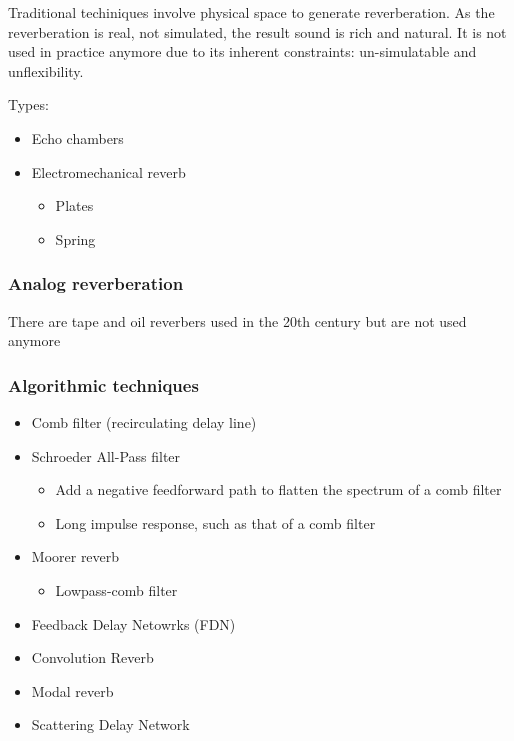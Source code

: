 \documentclass[11pt]{article}
\providecommand{\tightlist}{%
      \setlength{\itemsep}{0pt}\setlength{\parskip}{0pt}}
\begin{document}
Traditional techiniques involve physical space to generate
reverberation. As the reverberation is real, not simulated, the result
sound is rich and natural. It is not used in practice anymore due to its
inherent constraints: un-simulatable and unflexibility.

Types:

\begin{itemize}
\tightlist
\item
  Echo chambers
\item
  Electromechanical reverb

  \begin{itemize}
  \tightlist
  \item
    Plates
  \item
    Spring
  \end{itemize}
\end{itemize}

\hypertarget{analog-reverberation}{%
\subsubsection{Analog reverberation}\label{analog-reverberation}}

There are tape and oil reverbers used in the 20th century but are not
used anymore

\hypertarget{algorithmic-techniques}{%
\subsubsection{Algorithmic techniques}\label{algorithmic-techniques}}

\begin{itemize}
\tightlist
\item
  Comb filter (recirculating delay line)
\item
  Schroeder All-Pass filter

  \begin{itemize}
  \tightlist
  \item
    Add a negative feedforward path to flatten the spectrum of a comb
    filter
  \item
    Long impulse response, such as that of a comb filter
  \end{itemize}
\item
  Moorer reverb

  \begin{itemize}
  \tightlist
  \item
    Lowpass-comb filter
  \end{itemize}
\item
  Feedback Delay Netowrks (FDN)
\item
  Convolution Reverb
\item
  Modal reverb
\item
  Scattering Delay Network
\end{itemize}
\end{document}
